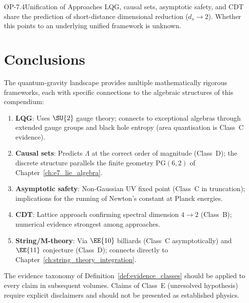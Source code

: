 \begin{openproblem}{OP-7.4}{Unification of Approaches}
LQG, causal sets, asymptotic safety, and CDT share the prediction of
short-distance dimensional reduction ($d_s \to 2$).  Whether this points
to an underlying unified framework is unknown.
\end{openproblem}

\section{Conclusions}
\label{sec:qg_conclusions}

The quantum-gravity landscape provides multiple mathematically rigorous
frameworks, each with specific connections to the algebraic structures of
this compendium:
\begin{enumerate}
    \item \textbf{LQG}: Uses $\SU{2}$ gauge theory; connects to
          exceptional algebras through extended gauge groups and black
          hole entropy (area quantisation is Class~C evidence).
    \item \textbf{Causal sets}: Predicts $\Lambda$ at the correct order
          of magnitude (Class~D); the discrete structure parallels the
          finite geometry PG$(6,2)$ of Chapter~\ref{ch:e7_lie_algebra}.
    \item \textbf{Asymptotic safety}: Non-Gaussian UV fixed point
          (Class~C in truncation); implications for the running of
          Newton's constant at Planck energies.
    \item \textbf{CDT}: Lattice approach confirming spectral dimension
          $4 \to 2$ (Class~B); numerical evidence strongest among
          approaches.
    \item \textbf{String/M-theory}: Via $\EE{10}$ billiards (Class~C
          asymptotically) and $\EE{11}$ conjecture (Class~D); connects
          directly to Chapter~\ref{ch:string_theory_integration}.
\end{enumerate}

The evidence taxonomy of Definition~\ref{def:evidence_classes} should
be applied to every claim in subsequent volumes.  Claims of Class~E
(unresolved hypothesis) require explicit disclaimers and should not be
presented as established physics.
